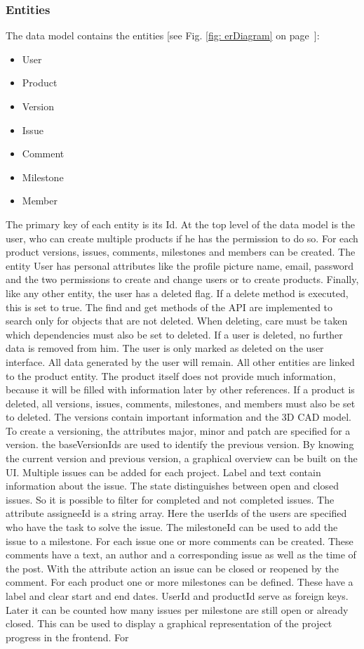     \subsubsection*{Entities}
    The data model contains the entities [see Fig. \ref{fig: erDiagram} on page~\pageref{fig: erDiagram}]:
    \begin{itemize}
        \item User
        \item Product
        \item Version
        \item Issue
        \item Comment
        \item Milestone
        \item Member
    \end{itemize}
    The primary key of each entity is its Id. At the top level of the data model is the user, who can create multiple products if he has the permission to do so. For each product versions, issues, comments, milestones and members can be created. The entity User has personal attributes like the profile picture name, email, password and the two permissions to create and change users or to create products. Finally, like any other entity, the user has a deleted flag. If a delete method is executed, this is set to true. The find and get methods of the API are implemented to search only for objects that are not deleted. When deleting, care must be taken which dependencies must also be set to deleted. If a user is deleted, no further data is removed from him. The user is only marked as deleted on the user interface. All data generated by the user will remain. All other entities are linked to the product entity. The product itself does not provide much information, because it will be filled with information later by other references. If a product is deleted, all versions, issues, comments, milestones, and members must also be set to deleted. The versions contain important information and the 3D CAD model. To create a versioning, the attributes major, minor and patch are specified for a version. the baseVersionIds are used to identify the previous version. By knowing the current version and previous version, a graphical overview can be built on the UI. Multiple issues can be added for each project. Label and text contain information about the issue. The state distinguishes between open and closed issues. So it is possible to filter for completed and not completed issues. The attribute assigneeId is a string array. Here the userIds of the users are specified who have the task to solve the issue. The milestoneId can be used to add the issue to a milestone. For each issue one or more comments can be created. These comments have a text, an author and a corresponding issue as well as the time of the post. With the attribute action an issue can be closed or reopened by the comment. For each product one or more milestones can be defined. These have a label and clear start and end dates. UserId and productId serve as foreign keys. Later it can be counted how many issues per milestone are still open or already closed. This can be used to display a graphical representation of the project progress in the frontend. For 